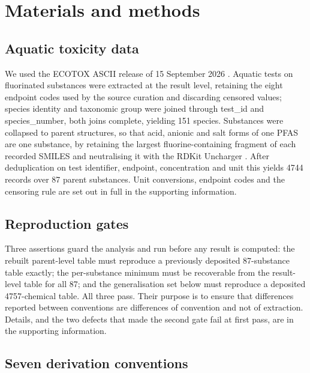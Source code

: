 \documentclass[preprint,12pt]{elsarticle}
\begin{document}
\section{Materials and methods}

\subsection{Aquatic toxicity data}

We used the ECOTOX ASCII release of 15 September 2026 \cite{olker2022ecotox}.
Aquatic tests on fluorinated substances were extracted at the result level,
retaining the eight endpoint codes used by the source curation and discarding
censored values; species identity and taxonomic group were joined through
\textsf{test\_id} and \textsf{species\_number}, both joins complete, yielding
151 species. Substances were collapsed to parent structures, so that acid,
anionic and salt forms of one PFAS are one substance, by retaining the largest
fluorine-containing fragment of each recorded SMILES and neutralising it with
the RDKit \textsf{Uncharger} \cite{rdkit}. After deduplication on test
identifier, endpoint, concentration and unit this yields 4744 records over 87
parent substances. Unit conversions, endpoint codes and the censoring rule are
set out in full in the supporting information.

\subsection{Reproduction gates}

Three assertions guard the analysis and run before any result is computed: the
rebuilt parent-level table must reproduce a previously deposited 87-substance
table exactly; the per-substance minimum must be recoverable from the
result-level table for all 87; and the generalisation set below must reproduce a
deposited 4757-chemical table. All three pass. Their purpose is to ensure that
differences reported between conventions are differences of convention and not
of extraction. Details, and the two defects that made the second gate fail at
first pass, are in the supporting information.

\subsection{Seven derivation conventions}
\end{document}

